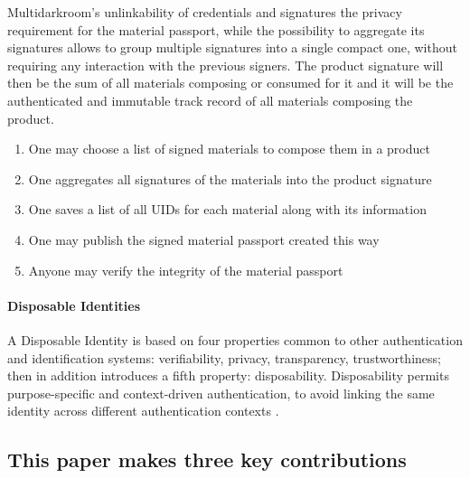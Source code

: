 \documentclass[twocolumn]{article}
\begin{document}
Multidarkroom's unlinkability of credentials and signatures the privacy
requirement for the material passport, while the possibility to
aggregate its signatures allows to group multiple signatures into a
single compact one, without requiring any interaction with the previous
signers. The product signature will then be the sum of all materials
composing or consumed for it and it will be the authenticated and
immutable track record of all materials composing the product.

\begin{enumerate}
  \item One may choose a list of signed materials to compose them in a product
  \item One aggregates all signatures of the materials into the product signature
  \item One saves a list of all UIDs for each material along with its information
  \item One may publish the signed material passport created this way 
  \item Anyone may verify the integrity of the material passport
\end{enumerate}

\paragraph*{Disposable Identities}

A Disposable Identity is based on four properties common to other
authentication and identification systems: verifiability, privacy,
transparency, trustworthiness; then in addition introduces a fifth
property: disposability. Disposability permits purpose-specific and
context-driven authentication, to avoid linking the same identity across
different authentication contexts \citep{dispid}.



\subsection*{This paper makes three key contributions}
\end{document}
